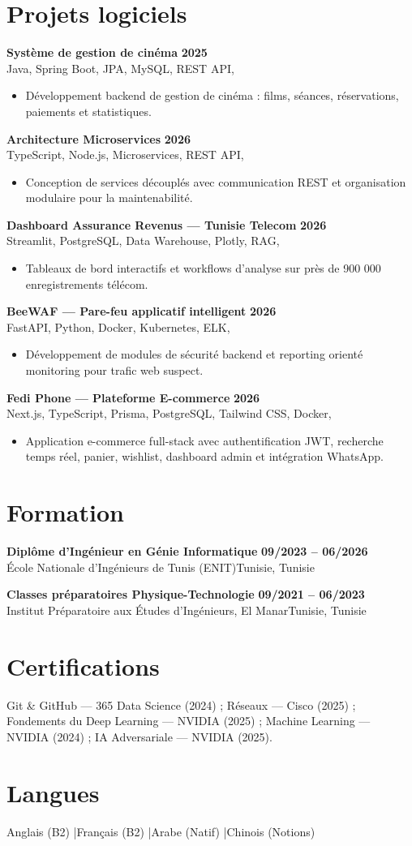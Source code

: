 \documentclass[a4paper,10pt]{article}
\newcommand{\cventry}[4]{\textbf{#1} \hfill \textbf{#4}\\[1pt]#2{\ifx\relax#3\relax\else, #3\fi}\par\vspace{2pt}}
\begin{document}
\section{Projets logiciels}
\cventry{Système de gestion de cinéma}{Java, Spring Boot, JPA, MySQL, REST API}{}{2025}
\begin{itemize}
  \item Développement backend de gestion de cinéma : films, séances, réservations, paiements et statistiques.
\end{itemize}
\cventry{Architecture Microservices}{TypeScript, Node.js, Microservices, REST API}{}{2026}
\begin{itemize}
  \item Conception de services découplés avec communication REST et organisation modulaire pour la maintenabilité.
\end{itemize}
\cventry{Dashboard Assurance Revenus — Tunisie Telecom}{Streamlit, PostgreSQL, Data Warehouse, Plotly, RAG}{}{2026}
\begin{itemize}
  \item Tableaux de bord interactifs et workflows d'analyse sur près de 900 000 enregistrements télécom.
\end{itemize}
\cventry{BeeWAF — Pare-feu applicatif intelligent}{FastAPI, Python, Docker, Kubernetes, ELK}{}{2026}
\begin{itemize}
  \item Développement de modules de sécurité backend et reporting orienté monitoring pour trafic web suspect.
\end{itemize}
\cventry{Fedi Phone — Plateforme E-commerce}{Next.js, TypeScript, Prisma, PostgreSQL, Tailwind CSS, Docker}{}{2026}
\begin{itemize}
  \item Application e-commerce full-stack avec authentification JWT, recherche temps réel, panier, wishlist, dashboard admin et intégration WhatsApp.
\end{itemize}
\section{Formation}
\cventry{Diplôme d'Ingénieur en Génie Informatique}{École Nationale d'Ingénieurs de Tunis (ENIT)}{Tunisie}{09/2023 -- 06/2026}
\cventry{Classes préparatoires Physique-Technologie}{Institut Préparatoire aux Études d'Ingénieurs, El Manar}{Tunisie}{09/2021 -- 06/2023}
\section{Certifications}
Git \& GitHub — 365 Data Science (2024) ; Réseaux — Cisco (2025) ; Fondements du Deep Learning — NVIDIA (2025) ; Machine Learning — NVIDIA (2024) ; IA Adversariale — NVIDIA (2025).
\section{Langues}
Anglais (B2) \quad|\quad Français (B2) \quad|\quad Arabe (Natif) \quad|\quad Chinois (Notions)
\end{document}
